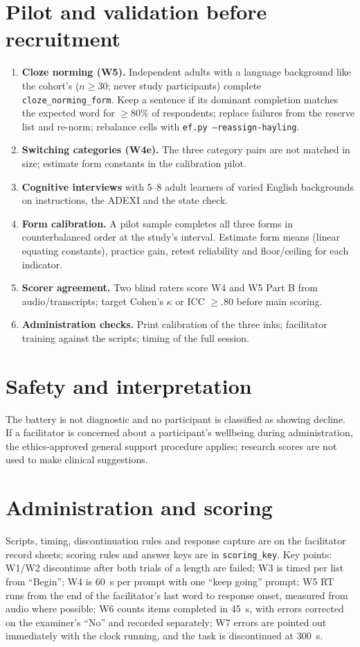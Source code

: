 \documentclass[11pt,a4paper]{article}
\begin{document}
\section{Pilot and validation before recruitment}
\begin{enumerate}
\item \textbf{Cloze norming (W5).} Independent adults with a language background like the cohort's ($n\ge30$; never study participants) complete \texttt{cloze\_norming\_form}. Keep a sentence if its dominant completion matches the expected word for $\ge 80\%$ of respondents; replace failures from the reserve list and re-norm; rebalance cells with \texttt{ef.py --reassign-hayling}.
\item \textbf{Switching categories (W4e).} The three category pairs are not matched in size; estimate form constants in the calibration pilot.
\item \textbf{Cognitive interviews} with 5--8 adult learners of varied English backgrounds on instructions, the ADEXI and the state check.
\item \textbf{Form calibration.} A pilot sample completes all three forms in counterbalanced order at the study's interval. Estimate form means (linear equating constants), practice gain, retest reliability and floor/ceiling for each indicator.
\item \textbf{Scorer agreement.} Two blind raters score W4 and W5 Part B from audio/transcripts; target Cohen's $\kappa$ or ICC $\ge .80$ before main scoring.
\item \textbf{Administration checks.} Print calibration of the three inks; facilitator training against the scripts; timing of the full session.
\end{enumerate}

\section{Safety and interpretation}
The battery is not diagnostic and no participant is classified as showing decline. If a facilitator is concerned about a participant's wellbeing during administration, the ethics-approved general support procedure applies; research scores are not used to make clinical suggestions.

\section{Administration and scoring}
Scripts, timing, discontinuation rules and response capture are on the facilitator record sheets; scoring rules and answer keys are in \texttt{scoring\_key}. Key points: W1/W2 discontinue after both trials of a length are failed; W3 is timed per list from ``Begin''; W4 is 60~s per prompt with one ``keep going'' prompt; W5 RT runs from the end of the facilitator's last word to response onset, measured from audio where possible; W6 counts items completed in 45~s, with errors corrected on the examiner's ``No'' and recorded separately; W7 errors are pointed out immediately with the clock running, and the task is discontinued at 300~s.
\end{document}
